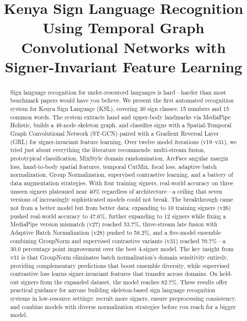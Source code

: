 \documentclass[conference]{IEEEtran}
\begin{document}
\title{Kenya Sign Language Recognition Using Temporal Graph Convolutional Networks with Signer-Invariant Feature Learning}

\author{
}

\maketitle

\begin{abstract}
Sign language recognition for under-resourced languages is hard---harder than most benchmark papers would have you believe. We present the first automated recognition system for Kenya Sign Language (KSL), covering 30 sign classes: 15 numbers and 15 common words. The system extracts hand and upper-body landmarks via MediaPipe Holistic, builds a 48-node skeleton graph, and classifies signs with a Spatial-Temporal Graph Convolutional Network (ST-GCN) paired with a Gradient Reversal Layer (GRL) for signer-invariant feature learning. Over twelve model iterations (v19--v31), we tried just about everything the literature recommends: multi-stream fusion, prototypical classification, MixStyle domain randomization, ArcFace angular margin loss, hand-to-body spatial features, temporal CutMix, focal loss, adaptive batch normalization, Group Normalization, supervised contrastive learning, and a battery of data augmentation strategies. With four training signers, real-world accuracy on three unseen signers plateaued near 40\% regardless of architecture---a ceiling that seven versions of increasingly sophisticated models could not break. The breakthrough came not from a better model but from better data: expanding to 10 training signers (v26) pushed real-world accuracy to 47.6\%, further expanding to 12 signers while fixing a MediaPipe version mismatch (v27) reached 53.7\%, three-stream late fusion with Adaptive Batch Normalization (v28) pushed to 58.2\%, and a five-model ensemble combining GroupNorm and supervised contrastive variants (v31) reached 70.7\%---a 30.0 percentage point improvement over the best 4-signer model. The key insight from v31 is that GroupNorm eliminates batch normalization's domain sensitivity entirely, providing complementary predictions that boost ensemble diversity, while supervised contrastive loss learns signer-invariant features that transfer across domains. On held-out signers from the expanded dataset, the model reaches 82.7\%. These results offer practical guidance for anyone building skeleton-based sign language recognition systems in low-resource settings: recruit more signers, ensure preprocessing consistency, and combine models with diverse normalization strategies before you reach for a bigger model.
\end{abstract}
\end{document}
